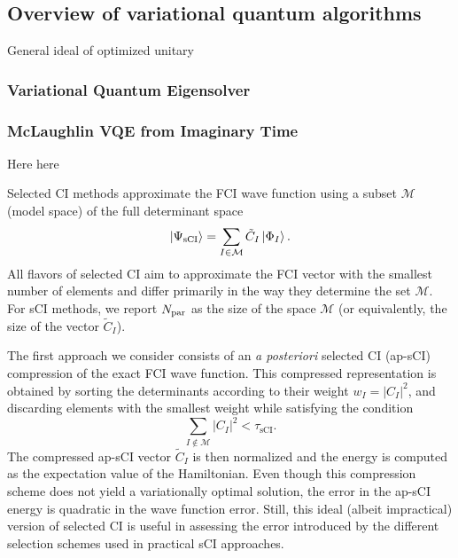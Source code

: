 \documentclass[aip,jcp,amsmath,amssymb, reprint]{revtex4-1}
\begin{document}
\subsection{Overview of variational quantum algorithms }
\label{sec:vqa}
General ideal of optimized unitary

\subsubsection{Variational Quantum Eigensolver}
\label{sec:vqe}

\subsubsection{McLaughlin VQE from Imaginary Time}
\label{sec:mvpit}

Here here

Selected CI methods approximate the FCI wave function using a subset $\mathcal{M}$ (model space) of the full determinant space
\begin{equation}
\ket{\Psi_\mathrm{sCI}} = \sum_{I \in \mathcal{M}} \tilde{C}_I \ket{\Phi_I}.
\end{equation}
All flavors of selected CI aim to approximate the FCI vector with the smallest number of elements and differ primarily in the way they determine the set $\mathcal{M}$.
For sCI methods, we report $N_{\rm{par}}$ as the size of the space $\mathcal{M}$ (or equivalently, the size of the vector $\tilde{C}_I$).

The first approach we consider consists of an \textit{a posteriori} selected CI (ap-sCI) compression of the exact FCI wave function.
This compressed representation is obtained by sorting the determinants according to their weight $w_I = |C_I|^2$, and discarding elements with the smallest weight while satisfying the condition
\begin{equation}
\sum_{I \notin \mathcal{M}} |C_I|^{2} < \tau_{\text{sCI}}.
\end{equation}
The compressed ap-sCI vector $\tilde{C}_I$ is then normalized and the energy is computed as the expectation value of the Hamiltonian.
Even though this compression scheme does not yield a variationally optimal solution, the error in the ap-sCI energy is quadratic in the wave function error.
Still, this ideal (albeit impractical) version of selected CI is useful in assessing the error introduced by the different selection schemes used in practical sCI approaches.
\end{document}
